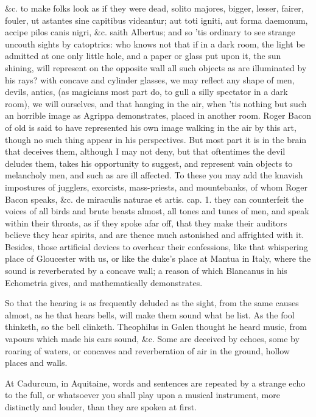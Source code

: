 {\&c. to make folks look as if they were dead, solito majores,
bigger, lesser, fairer, fouler, ut astantes sine capitibus videantur;
aut toti igniti, aut forma daemonum, accipe pilos canis nigri, \&c.
saith Albertus; and so 'tis ordinary to see strange uncouth sights by
catoptrics: who knows not that if in a dark room, the light be admitted
at one only little hole, and a paper or glass put upon it, the sun
shining, will represent on the opposite wall all such objects as are
illuminated by his rays? with concave and cylinder glasses, we may
reflect any shape of men, devils, antics, (as magicians most part do,
to gull a silly spectator in a dark room), we will ourselves, and that
hanging in the air, when 'tis nothing but such an horrible image as
Agrippa demonstrates, placed in another room. Roger Bacon of old
is said to have represented his own image walking in the air by this
art, though no such thing appear in his perspectives. But most part it
is in the brain that deceives them, although I may not deny, but that
oftentimes the devil deludes them, takes his opportunity to suggest,
and represent vain objects to melancholy men, and such as are ill
affected. To these you may add the knavish impostures of jugglers,
exorcists, mass-priests, and mountebanks, of whom Roger Bacon speaks,
\&c. de miraculis naturae et artis. cap. 1. they can counterfeit
the voices of all birds and brute beasts almost, all tones and tunes of
men, and speak within their throats, as if they spoke afar off, that
they make their auditors believe they hear spirits, and are thence much
astonished and affrighted with it. Besides, those artificial devices to
overhear their confessions, like that whispering place of Gloucester
with us, or like the duke's place at Mantua in Italy, where the
sound is reverberated by a concave wall; a reason of which Blancanus in
his Echometria gives, and mathematically demonstrates.

So that the hearing is as frequently deluded as the sight, from the
same causes almost, as he that hears bells, will make them sound what
he list. As the fool thinketh, so the bell clinketh. Theophilus in
Galen thought he heard music, from vapours which made his ears sound,
\&c. Some are deceived by echoes, some by roaring of waters, or concaves
and reverberation of air in the ground, hollow places and walls.

At Cadurcum, in Aquitaine, words and sentences are repeated by a
strange echo to the full, or whatsoever you shall play upon a musical
instrument, more distinctly and louder, than they are spoken at first.

}
